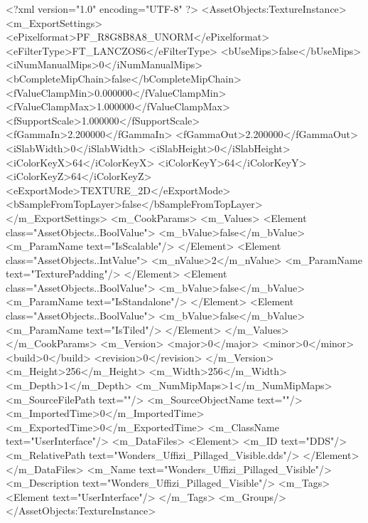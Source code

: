<?xml version="1.0" encoding="UTF-8" ?>
<AssetObjects:TextureInstance>
<m_ExportSettings>
<ePixelformat>PF_R8G8B8A8_UNORM</ePixelformat>
<eFilterType>FT_LANCZOS6</eFilterType>
<bUseMips>false</bUseMips>
<iNumManualMips>0</iNumManualMips>
<bCompleteMipChain>false</bCompleteMipChain>
<fValueClampMin>0.000000</fValueClampMin>
<fValueClampMax>1.000000</fValueClampMax>
<fSupportScale>1.000000</fSupportScale>
<fGammaIn>2.200000</fGammaIn>
<fGammaOut>2.200000</fGammaOut>
<iSlabWidth>0</iSlabWidth>
<iSlabHeight>0</iSlabHeight>
<iColorKeyX>64</iColorKeyX>
<iColorKeyY>64</iColorKeyY>
<iColorKeyZ>64</iColorKeyZ>
<eExportMode>TEXTURE_2D</eExportMode>
<bSampleFromTopLayer>false</bSampleFromTopLayer>
</m_ExportSettings>
<m_CookParams>
<m_Values>
<Element class="AssetObjects..BoolValue">
<m_bValue>false</m_bValue>
<m_ParamName text="IsScalable"/>
</Element>
<Element class="AssetObjects..IntValue">
<m_nValue>2</m_nValue>
<m_ParamName text="TexturePadding"/>
</Element>
<Element class="AssetObjects..BoolValue">
<m_bValue>false</m_bValue>
<m_ParamName text="IsStandalone"/>
</Element>
<Element class="AssetObjects..BoolValue">
<m_bValue>false</m_bValue>
<m_ParamName text="IsTiled"/>
</Element>
</m_Values>
</m_CookParams>
<m_Version>
<major>0</major>
<minor>0</minor>
<build>0</build>
<revision>0</revision>
</m_Version>
<m_Height>256</m_Height>
<m_Width>256</m_Width>
<m_Depth>1</m_Depth>
<m_NumMipMaps>1</m_NumMipMaps>
<m_SourceFilePath text=""/>
<m_SourceObjectName text=""/>
<m_ImportedTime>0</m_ImportedTime>
<m_ExportedTime>0</m_ExportedTime>
<m_ClassName text="UserInterface"/>
<m_DataFiles>
<Element>
<m_ID text="DDS"/>
<m_RelativePath text="Wonders_Uffizi_Pillaged_Visible.dds"/>
</Element>
</m_DataFiles>
<m_Name text="Wonders_Uffizi_Pillaged_Visible"/>
<m_Description text="Wonders_Uffizi_Pillaged_Visible"/>
<m_Tags>
<Element text="UserInterface"/>
</m_Tags>
<m_Groups/>
</AssetObjects:TextureInstance>
